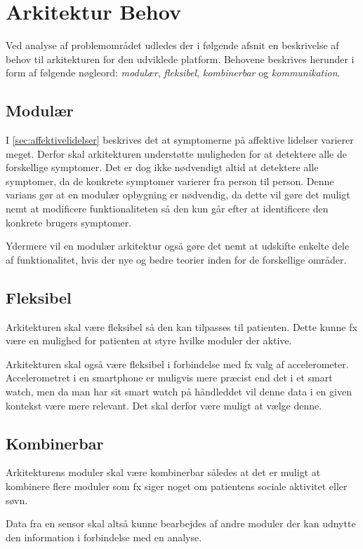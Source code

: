 \section{Arkitektur Behov}\label{arkitekturkrav}
Ved analyse af problemområdet udledes der i følgende afsnit en beskrivelse af behov til arkitekturen for den udviklede platform.
Behovene beskrives herunder i form af følgende nøgleord: \textit{modulær}, \textit{fleksibel}, \textit{kombinerbar} og \textit{kommunikation}.

\subsection{Modulær}\label{arkitekturkrav::modulaer}
I \cref{sec:affektivelidelser} beskrives det at symptomerne på affektive lidelser varierer meget.
Derfor skal arkitekturen understøtte muligheden for at detektere alle de forskellige symptomer.
Det er dog ikke nødvendigt altid at detektere alle symptomer, da de konkrete symptomer varierer fra person til person.
Denne varians gør at en modulær opbygning er nødvendig, da dette vil gøre det muligt nemt at modificere funktionaliteten så den kun går efter at identificere den konkrete brugers symptomer.

Ydermere vil en modulær arkitektur også gøre det nemt at udskifte enkelte dele af funktionalitet, hvis der nye og bedre teorier inden for de forskellige områder.

\subsection{Fleksibel}
Arkitekturen skal være fleksibel så den kan tilpasses til patienten.
Dette kunne fx være en mulighed for patienten at styre hvilke moduler der aktive.

Arkitekturen skal også være fleksibel i forbindelse med fx valg af accelerometer.
Accelerometret i en smartphone er muligvis mere præcist end det i et smart watch, men da man har sit smart watch på håndleddet vil denne data i en given kontekst være mere relevant.
Det skal derfor være muligt at vælge denne.

\subsection{Kombinerbar}%
Arkitekturens moduler skal være kombinerbar således at det er muligt at kombinere flere moduler som fx siger noget om patientens sociale aktivitet eller søvn.

Data fra en sensor skal altså kunne bearbejdes af andre moduler der kan udnytte den information i forbindelse med en analyse.

